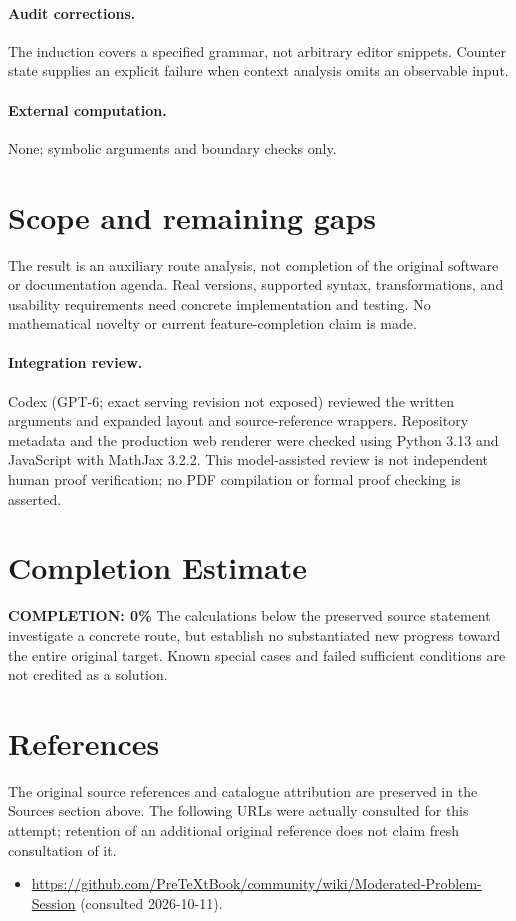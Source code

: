 \documentclass[11pt]{article}
\begin{document}
\paragraph{Audit corrections.} The induction covers a specified grammar, not arbitrary editor snippets. Counter state supplies an explicit failure when context analysis omits an observable input.
\paragraph{External computation.} None; symbolic arguments and boundary checks only.
\section{Scope and remaining gaps}
The result is an auxiliary route analysis, not completion of the original software or documentation agenda. Real versions, supported syntax, transformations, and usability requirements need concrete implementation and testing. No mathematical novelty or current feature-completion claim is made.
\paragraph{Integration review.} Codex (GPT-6; exact serving revision not exposed) reviewed the written arguments and expanded layout and source-reference wrappers. Repository metadata and the production web renderer were checked using Python 3.13 and JavaScript with MathJax 3.2.2. This model-assisted review is not independent human proof verification; no PDF compilation or formal proof checking is asserted.

\section{Completion Estimate}
\noindent\textbf{COMPLETION: 0\%}
The calculations below the preserved source statement investigate a concrete route,
but establish no substantiated new progress toward the entire original target.
Known special cases and failed sufficient conditions are not credited as a solution.
\section{References}
The original source references and catalogue attribution are preserved in the
Sources section above. The following URLs were actually consulted for this attempt;
retention of an additional original reference does not claim fresh consultation of it.
\begin{itemize}
\item \url{https://github.com/PreTeXtBook/community/wiki/Moderated-Problem-Session} (consulted 2026-10-11). 
\end{itemize}
\end{document}

